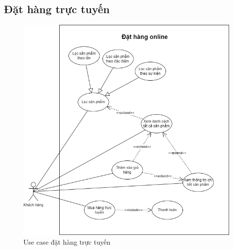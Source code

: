 \subsection{Đặt hàng trực tuyến}

     \begin{figure}[!htp]
        \centering
        \includegraphics[width=12cm]{img/UseCase/UseCase-Đặt hàng.drawio.png}
        \newline
        \caption{Use case đặt hàng trực tuyến}
    \end{figure}
